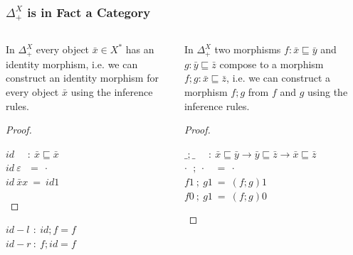 \documentclass[aspectratio=169]{beamer}
\theoremstyle{remarkstyle}
\begin{document}
\begin{frame}[fragile]
  \frametitle{$Δ_+^X$ is in Fact a Category}
  \begin{columns}
    \begin{column}{0.33\textwidth}
      \begin{lemma}
        \begin{small}
          In $Δ_+^X$ every object $\bar{x} ∈ X^*$ has an identity morphism, 
          i.e. we can construct an identity morphism for every object $\bar{x}$ using the inference rules.
        \end{small}
      \end{lemma}
      \begin{proof}
        \begin{small}
        $id \ \ \ \ \ \ : \ \bar{x} ⊑ \bar{x}$\\
        $id \ ε \ \ \ = \ ·$\\
        $id \ \bar{x} x \ = \ id 1$
        \end{small}
      \end{proof}
      \begin{corollary}
        \begin{small}
        $id-l \ \, : \ id ; f = f$ \\
        $id-r \ : \ f;id = f$
        \end{small}
      \end{corollary}  
    \end{column}
    \begin{column}{0.62\textwidth}
      \begin{lemma}
        \begin{small}
        In $Δ_+^X$ two morphisms $f : \bar{x} ⊑ \bar{y}$ and $g : \bar{y} ⊑ \bar{z}$ 
        compose to a morphism $f;g : \bar{x} ⊑ \bar{z}$, 
        i.e. we can construct a morphism $f;g$ from $f$ and $g$ using the inference rules.
        \end{small}
      \end{lemma}
      \begin{proof}
        \begin{small}
        $\_;\_ \ \ \ \ \ \ : \ \bar{x} ⊑ \bar{y} → \bar{y} ⊑ \bar{z} → \bar{x} ⊑ \bar{z}$\\
        $·  \ \ \, ; \ · \ \ \ \ = \ ·$\\
        $f 1  \ ; \ g 1 \ = \ (f;g)1$\\
        $f 0 \ ; \ g 1  \ = \ (f;g)0$\\

\end{small}
\end{proof}
\end{column}
\end{columns}
\end{frame}
\end{document}
